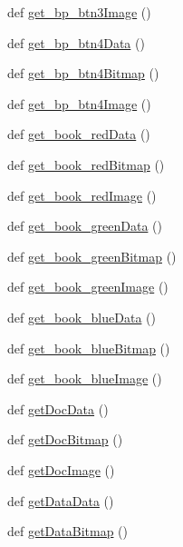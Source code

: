 \begin{DoxyCompactItemize}
\item 
def \hyperlink{namespaceimages_a4a775bb497640194045625f016d30596}{get\+\_\+bp\+\_\+btn3\+Image} ()
\item 
def \hyperlink{namespaceimages_aabed8c0b0b17b674f4da05e431d02b0e}{get\+\_\+bp\+\_\+btn4\+Data} ()
\item 
def \hyperlink{namespaceimages_aab3dcebc8b03f07f787b4d0edc66f559}{get\+\_\+bp\+\_\+btn4\+Bitmap} ()
\item 
def \hyperlink{namespaceimages_a62db2969eb50a2642e6e0f418bdb0ccc}{get\+\_\+bp\+\_\+btn4\+Image} ()
\item 
def \hyperlink{namespaceimages_a1d69045b3511549861c0100d3448f9a6}{get\+\_\+book\+\_\+red\+Data} ()
\item 
def \hyperlink{namespaceimages_a0bedc3472fa89f335bdcd8607d77edf9}{get\+\_\+book\+\_\+red\+Bitmap} ()
\item 
def \hyperlink{namespaceimages_a0e1759b6e5c78ef3b1f0b39fc7348e80}{get\+\_\+book\+\_\+red\+Image} ()
\item 
def \hyperlink{namespaceimages_abfee1f116e5f3604f71862b5a039049b}{get\+\_\+book\+\_\+green\+Data} ()
\item 
def \hyperlink{namespaceimages_a74775151671cf449130b4633d98fd269}{get\+\_\+book\+\_\+green\+Bitmap} ()
\item 
def \hyperlink{namespaceimages_a2b9a8cbc20f7bf72e18cac42aff4dca7}{get\+\_\+book\+\_\+green\+Image} ()
\item 
def \hyperlink{namespaceimages_a9bec51464c6a49d85543696895516451}{get\+\_\+book\+\_\+blue\+Data} ()
\item 
def \hyperlink{namespaceimages_a5e3e22e08960039b29ff55566be4691c}{get\+\_\+book\+\_\+blue\+Bitmap} ()
\item 
def \hyperlink{namespaceimages_aec387bcd60dd97d588c6c8e1d8fc636a}{get\+\_\+book\+\_\+blue\+Image} ()
\item 
def \hyperlink{namespaceimages_a1e1aebcf5b98a65f95e4511e03d9f631}{get\+Doc\+Data} ()
\item 
def \hyperlink{namespaceimages_a633a6f08f408fa61efd87082b30a729b}{get\+Doc\+Bitmap} ()
\item 
def \hyperlink{namespaceimages_a3f894481ce4bf93e759ae2435f904776}{get\+Doc\+Image} ()
\item 
def \hyperlink{namespaceimages_ab1c77e22e2c32cd1bf3bb8fe77f8298d}{get\+Data\+Data} ()
\item 
def \hyperlink{namespaceimages_ac5e2fd592a34c8a0a281d5a6744c81e0}{get\+Data\+Bitmap} ()
\item 

\end{DoxyCompactItemize}
